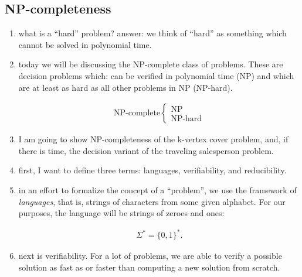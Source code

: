 \newpage
\subsection{NP-completeness}

\begin{enumerate} \item what is a ``hard'' problem? answer: we think of ``hard''
      as something which cannot be solved in polynomial time.

  \item today we will be discussing the NP-complete class of problems. These are
    decision problems which: can be verified in polynomial time (NP) and which
    are at least as hard as all other problems in NP (NP-hard).

    \begin{textred}
      \begin{align}
        \text{NP-complete}
        \begin{cases}
          \text{NP}\\
          \text{NP-hard}
        \end{cases}
      \end{align}
    \end{textred}

  \item I am going to show NP-completeness of the k-vertex cover problem, and,
    if there is time, the decision variant of the traveling salesperson problem.

  \item first, I want to define three terms: languages, verifiability, and
    reducibility.

  \item in an effort to formalize the concept of a ``problem'', we use the
    framework of \emph{languages}, that is, strings of characters from some
    given alphabet. For our purposes, the language will be strings of zeroes and
    ones:

      \begin{textred}
      \begin{align}
        \Sigma^\ast = \{0, 1\}^\ast.
      \end{align}
      \end{textred}

  \item next is verifiability. For a lot of problems, we are able to verify a
    possible solution as fast as or faster than computing a new solution from
    scratch.


\end{enumerate}
